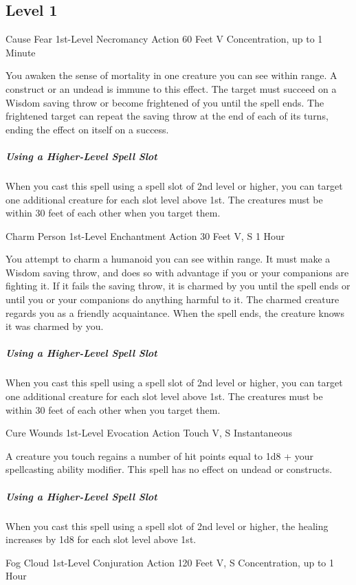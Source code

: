 \documentclass[letterpaper,openany,oneside,twocolumn]{book}
\begin{document}
\subsection*{Level 1}

\DndSpellHeader
  {Cause Fear}
  {1st-Level Necromancy}
  {Action}
  {60 Feet}
  {V}
  {Concentration, up to 1 Minute}

You awaken the sense of mortality in one creature you can see within range. A construct or an undead is immune to this effect. The target must succeed on a Wisdom saving throw or become frightened of you until the spell ends. The frightened target can repeat the saving throw at the end of each of its turns, ending the effect on itself on a success.

\subparagraph*{Using a Higher-Level Spell Slot} When you cast this spell using a spell slot of 2nd level or higher, you can target one additional creature for each slot level above 1st. The creatures must be within 30 feet of each other when you target them.

\DndSpellHeader
  {Charm Person}
  {1st-Level Enchantment}
  {Action}
  {30 Feet}
  {V, S}
  {1 Hour}

You attempt to charm a humanoid you can see within range. It must make a Wisdom saving throw, and does so with advantage if you or your companions are fighting it. If it fails the saving throw, it is charmed by you until the spell ends or until you or your companions do anything harmful to it. The charmed creature regards you as a friendly acquaintance. When the spell ends, the creature knows it was charmed by you.

\subparagraph*{Using a Higher-Level Spell Slot} When you cast this spell using a spell slot of 2nd level or higher, you can target one additional creature for each slot level above 1st. The creatures must be within 30 feet of each other when you target them.

\DndSpellHeader
  {Cure Wounds}
  {1st-Level Evocation}
  {Action}
  {Touch}
  {V, S}
  {Instantaneous}

A creature you touch regains a number of hit points equal to 1d8 + your spellcasting ability modifier. This spell has no effect on undead or constructs.

\subparagraph*{Using a Higher-Level Spell Slot} When you cast this spell using a spell slot of 2nd level or higher, the healing increases by 1d8 for each slot level above 1st.

\DndSpellHeader
  {Fog Cloud}
  {1st-Level Conjuration}
  {Action}
  {120 Feet}
  {V, S}
  {Concentration, up to 1 Hour}
\end{document}
